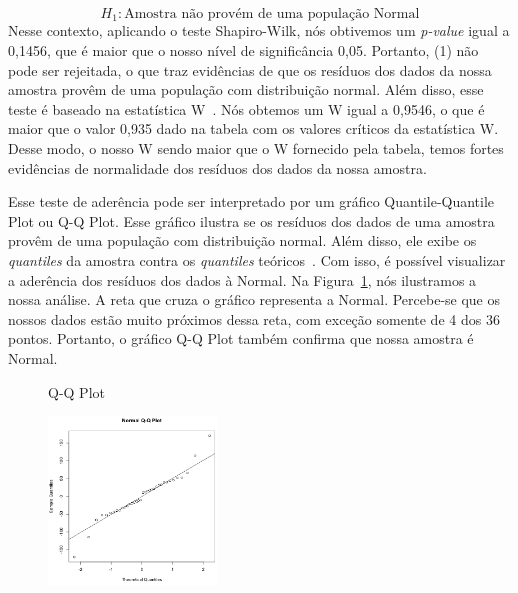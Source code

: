 \begin{equation}
	H_{1} : \text{Amostra não provém de uma população Normal}
\end{equation}
\normalsize
Nesse contexto, aplicando o teste Shapiro-Wilk, nós obtivemos um \emph{p-value} igual a 0,1456, que é maior que o nosso nível de significância 0,05. Portanto, (1) não pode ser rejeitada, o que traz evidências de que os resíduos dos dados da nossa amostra provêm de uma população com distribuição normal. Além disso, esse teste é baseado na estatística W~\cite{estatisticaw}. Nós obtemos um W igual a 0,9546, o que é maior que o valor 0,935 dado na tabela com os valores críticos da estatística W. Desse modo, o nosso W sendo maior que o W fornecido pela tabela, temos fortes evidências de normalidade dos resíduos dos dados da nossa amostra.

Esse teste de aderência pode ser interpretado por um gráfico Quantile-Quantile Plot ou Q-Q Plot. Esse gráfico ilustra se os resíduos dos dados de uma amostra provêm de uma população com distribuição normal. Além disso, ele exibe os \emph{quantiles} da amostra contra os \emph{quantiles} teóricos~\cite{Wilk1968}. Com isso, é possível visualizar a aderência dos resíduos dos dados à Normal. Na Figura~\ref{fig:grafico1}, nós ilustramos a nossa análise. A reta que cruza o gráfico representa a Normal. Percebe-se que os nossos dados estão muito próximos dessa reta, com exceção somente de 4 dos 36 pontos. Portanto, o gráfico Q-Q Plot também confirma que nossa amostra é Normal.


\begin{figure}[t]
	\caption{Q-Q Plot}
    \centering
    \includegraphics[width=0.4\textwidth]{images/qqplot.png}
    \caption{}
    \label{fig:grafico1}
\end{figure}